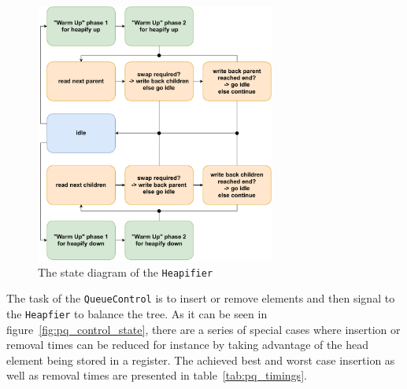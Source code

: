 \documentclass[runningheads]{llncs}
\begin{document}
\begin{figure}
	\centering
	\includegraphics[width=0.7\textwidth]{HeapifierStateDiagram.pdf}
	\caption{The state diagram of the \texttt{Heapifier}}
	\label{fig:pq_heapifier_state}
\end{figure}

The task of the \texttt{QueueControl} is to insert or remove elements and then signal to the \texttt{Heapfier} to balance the tree. As it can be seen in figure~\ref{fig:pq_control_state}, there are a series of special cases where insertion or removal times can be reduced for instance by taking advantage of the head element
being stored in a register. The achieved best and worst case insertion as well as removal times are presented in table~\ref{tab:pq_timings}.
\end{document}

